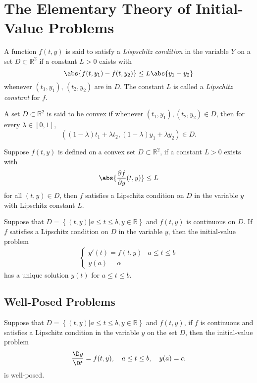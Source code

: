 \section{The Elementary Theory of Initial-Value Problems}
\begin{defn}
A function $f(t,y)$ is said to satisfy a \emph{Lispschitz condition} in the variable $Y$ on a set $D\subset\mathbb{R}^2$ if a constant $L>0$ exists with
\[
\abs{f(t,y_1)-f(t,y_2)}\leq L\abs{y_1-y_2}
\]
whenever $(t_1,y_1)$, $(t_2,y_2)$ are in $D$. The constant $L$ is called a \emph{Lipschitz constant} for $f$.
\end{defn}
\begin{defn}[Convex]
A set $D\subset\mathbb{R}^2$ is said to be convex if whenever $(t_1,y_1),(t_2,y_2)\in D$, then for every $\lambda\in [0,1]$,
\[
((1-\lambda)t_1+\lambda t_2, (1-\lambda)y_1+\lambda y_2) \in D.
\]
\end{defn}
\begin{theo}
Suppose $f(t,y)$ is defined on a convex set $D\subset\mathbb{R}^2$, if a constant $L>0$ exists with
\[
\abs{\frac{\partial f}{\partial y}(t,y)}\leq L
\]
for all $(t,y)\in D$, then $f$ satisfies a Lipschitz condition on $D$ in the variable $y$ with Lipschitz constant $L$.
\end{theo}
\begin{theo}
Suppose that $D=\left\{(t,y)|a\leq t\leq b,y\in\mathbb{R}\right\}$ and $f(t,y)$ is continuous on $D$. If $f$ satisfies a Lipschitz condition on $D$ in the variable $y$, then the initial-value problem
\begin{align*}
  \begin{cases}
    y'(t)=f(t,y) & a\leq t\leq b \\
    y(a)=\alpha
  \end{cases}
\end{align*}
has a unique solution $y(t)$ for $a\leq t\leq b$.
\end{theo}
\subsection{Well-Posed Problems}
\begin{theo}
Suppose that $D=\left\{(t,y)|a\leq t\leq b,y\in\mathbb{R}\right\}$ and $f(t,y)$, if $f$ is continuous and satisfies a Lipschitz condition in the variable $y$ on the set $D$, then the initial-value problem
\[
\frac{\D y}{\D t}=f(t,y),\quad a\leq t\leq b,\quad y(a)=\alpha
\]
is well-posed.
\end{theo}